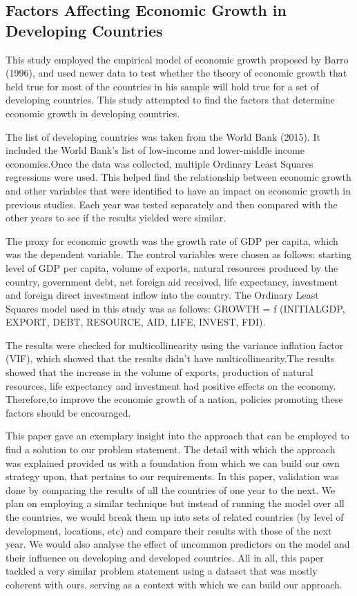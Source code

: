 \documentclass[conference]{IEEEtran}
\begin{document}
\subsection{Factors Affecting Economic Growth in Developing Countries}\label{econgrwth}
This study employed the empirical model of economic growth proposed by Barro (1996), and used newer data to test whether the theory of economic growth that held true for most of the countries in his sample will hold true for a set of developing countries. This study attempted to find the factors that determine economic growth in developing countries.

The list of developing countries was taken from the World Bank (2015). It included the World Bank's list of low-income and lower-middle income economies.Once the data was collected, multiple Ordinary Least Squares regressions were used. This helped find the relationship between economic growth and other variables that were identified to have an impact on economic growth in previous studies. Each year was tested separately and then compared with the other years to see if the results yielded were similar.

The proxy for economic growth was the growth rate of GDP per capita, which was the dependent variable. The control variables were chosen as follows: starting level of GDP per capita, volume of exports, natural resources produced by the country, government debt, net foreign aid received, life expectancy, investment and foreign direct investment inflow into the country. The Ordinary Least Squares model used in this study was as follows: GROWTH = f (INITIALGDP, EXPORT, DEBT, RESOURCE, AID, LIFE, INVEST, FDI). 

The results were checked for multicollinearity using the variance inflation factor (VIF), which showed that the results didn’t have multicollinearity.The results showed that the increase in the volume of exports, production of natural resources, life expectancy and investment had positive effects on the economy. Therefore,to improve the economic growth of a nation, policies promoting these factors should be encouraged.

This paper gave an exemplary insight into the approach that can be employed to find a solution to  our problem statement. The detail with which the approach was explained provided us with a foundation from which we can build our own strategy upon, that pertains to our requirements. In this paper, validation was done by comparing the results of all the countries of one year to the next. We plan on employing a similar technique but instead of running the model over all the countries, we would break them up into sets of related countries (by level of development, locations, etc) and compare their results with those of the next year. We would also analyse the effect of uncommon predictors on the model and their influence on developing and developed countries. All in all, this paper tackled a very similar problem statement using a dataset that was mostly coherent with ours, serving as a context with which we can build our approach. 
\end{document}
